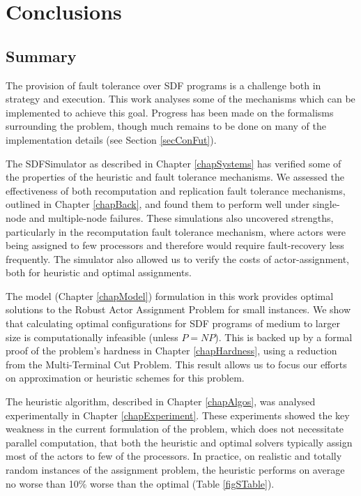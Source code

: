 \chapter{Conclusions}
\label{chapConclusion}

\section{Summary}

The provision of fault tolerance over SDF programs is a challenge both in strategy and execution.
This work analyses some of the mechanisms which can be implemented to achieve this goal.
Progress has been made on the formalisms surrounding the problem, though much remains to be done on many of the implementation details (see Section \ref{secConFut}).

The SDFSimulator as described in Chapter \ref{chapSystems} has verified some of the properties of the heuristic and fault tolerance mechanisms.
We assessed the effectiveness of both recomputation and replication fault tolerance mechanisms, outlined in Chapter \ref{chapBack}, and found them to perform well under single-node and multiple-node failures.
These simulations also uncovered strengths, particularly in the recomputation fault tolerance mechanism, where actors were being assigned to few processors and therefore would require fault-recovery less frequently.
The simulator also allowed us to verify the costs of actor-assignment, both for heuristic and optimal assignments.

The model (Chapter \ref{chapModel}) formulation in this work provides optimal solutions to the Robust Actor Assignment Problem for small instances.
We show that calculating optimal configurations for SDF programs of medium to larger size is computationally infeasible (unless $P = NP$).
This is backed up by a formal proof of the problem's hardness in Chapter \ref{chapHardness}, using a reduction from the Multi-Terminal Cut Problem.
This result allows us to focus our efforts on approximation or heuristic schemes for this problem.

The heuristic algorithm, described in Chapter \ref{chapAlgos}, was analysed experimentally in Chapter \ref{chapExperiment}.
These experiments showed the key weakness in the current formulation of the problem, which does not necessitate parallel computation, that both the heuristic and optimal solvers typically assign most of the actors to few of the processors.
In practice, on realistic and totally random instances of the assignment problem, the heuristic performs on average no worse than 10\% worse than the optimal (Table \ref{figSTable}).

